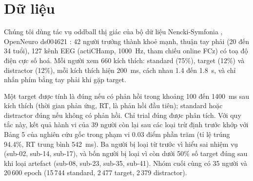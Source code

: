 \section{Dữ liệu}
\label{ch:data}

Chúng tôi dùng tác vụ oddball thị giác của bộ dữ liệu Nencki-Symfonia \citep{dzianok2022}, OpenNeuro ds004621 \citep{dzianok2022data}: 42 người trưởng thành khoẻ mạnh, thuận tay phải (20 đến 34 tuổi), 127 kênh EEG (actiCHamp, 1000~Hz, tham chiếu online FCz) có toạ độ điện cực số hoá. Mỗi người xem 660 kích thích: standard (75\%), target (12\%) và distractor (12\%), mỗi kích thích hiện 200~ms, cách nhau 1.4 đến 1.8~s, và chỉ nhấn phím bằng tay phải khi gặp target.

Một target được tính là đúng nếu có phản hồi trong khoảng 100 đến 1400~ms sau kích thích (thời gian phản ứng, RT, là phản hồi đầu tiên); standard hoặc distractor đúng nếu không có phản hồi. Chỉ trial đúng được phân tích. Với quy tắc này, kết quả hành vi của 39 người còn lại sau các loại trừ định trước khớp với Bảng 5 của nghiên cứu gốc trong phạm vi 0.03 điểm phần trăm (tỉ lệ trúng 94.4\%, RT trung bình 542~ms). Ba người bị loại từ trước vì hiểu sai nhiệm vụ (sub-02, sub-14, sub-17), và bốn người bị loại vì còn dưới 50\% số target đúng sau khi loại artefact (sub-08, sub-23, sub-35, sub-41). Nhóm cuối cùng có 35 người và 20\,600 epoch (15\,744 standard, 2\,477 target, 2\,379 distractor).
